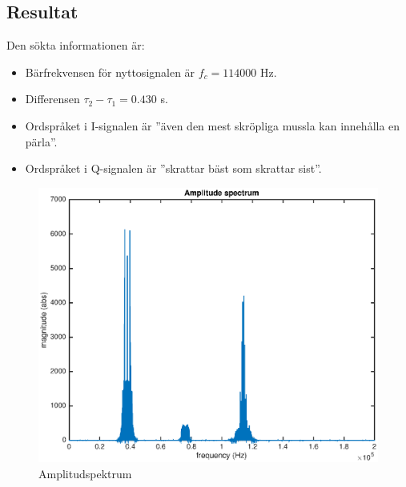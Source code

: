 \documentclass[10pt]{article}
\begin{document}
\begin{multicols}{2}
\section{Resultat}

Den sökta informationen är:

\begin{itemize}
\item Bärfrekvensen för nyttosignalen är $f_c = 114000$ Hz.
\item Differensen $\tau_{2} - \tau_{1} = 0.430$ s.
\item Ordspråket i I-signalen är ''även den mest skröpliga mussla kan innehålla en pärla''.
\item Ordspråket i Q-signalen är ''skrattar bäst som skrattar sist''.
\end{itemize}
\end{multicols}

\clearpage

\begin{figure}
  \centering
  \includegraphics[scale=0.55]{figurer/amplitudspektrum.eps}
  \caption{Amplitudspektrum}
  \label{amplitudspektrum}
\end{figure}
\end{document}
